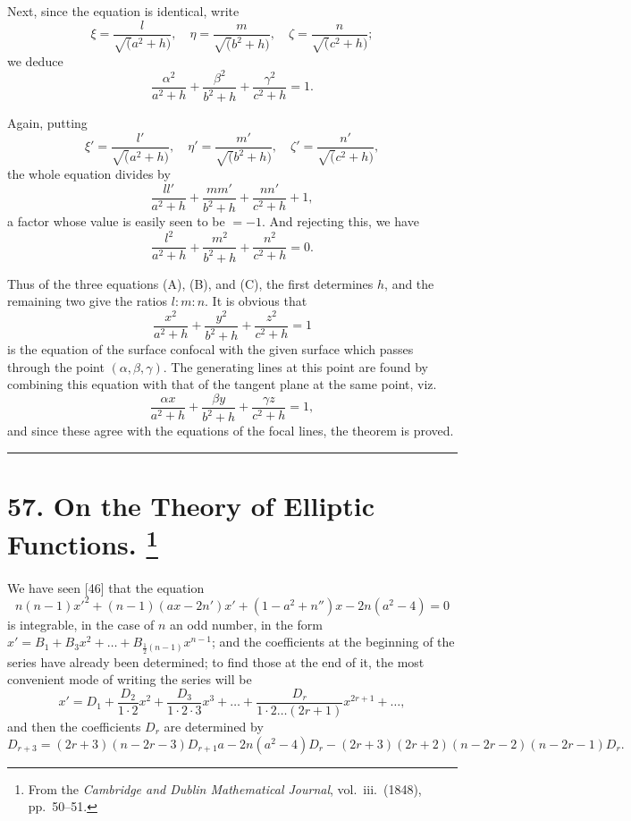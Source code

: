 \documentclass[11pt,a4paper]{article}
\theoremstyle{plain}
\theoremstyle{definition}
\begin{document}
Next, since the equation is identical, write
\[
\xi = \frac{l}{\surd(a^2 + h)}, \quad \eta = \frac{m}{\surd(b^2 + h)}, \quad \zeta = \frac{n}{\surd(c^2 + h)};
\]
we deduce
\[
\frac{\alpha^2}{a^2 + h} + \frac{\beta^2}{b^2 + h} + \frac{\gamma^2}{c^2 + h} = 1.
\]

Again, putting
\[
\xi' = \frac{l'}{\surd(a^2 + h)}, \quad \eta' = \frac{m'}{\surd(b^2 + h)}, \quad \zeta' = \frac{n'}{\surd(c^2 + h)},
\]
the whole equation divides by
\[
\frac{ll'}{a^2 + h} + \frac{mm'}{b^2 + h} + \frac{nn'}{c^2 + h} + 1,
\]
a factor whose value is easily seen to be $= -1$. And rejecting this, we have
\[
\frac{l^2}{a^2 + h} + \frac{m^2}{b^2 + h} + \frac{n^2}{c^2 + h} = 0. \tag{C}
\]

Thus of the three equations (A), (B), and (C), the first determines $h$, and the remaining
two give the ratios $l : m : n$. It is obvious that
\[
\frac{x^2}{a^2 + h} + \frac{y^2}{b^2 + h} + \frac{z^2}{c^2 + h} = 1
\]
is the equation of the surface confocal with the given surface which passes through
the point $(\alpha, \beta, \gamma)$. The generating lines at this point are found by combining this
equation with that of the tangent plane at the same point, viz.
\[
\frac{\alpha x}{a^2 + h} + \frac{\beta y}{b^2 + h} + \frac{\gamma z}{c^2 + h} = 1,
\]
and since these agree with the equations of the focal lines, the theorem is proved.

\bigskip
\hrule
\bigskip

\newpage
\section[On the Theory of Elliptic Functions]{%
57. On the Theory of Elliptic Functions.%
\footnote{From the \textit{Cambridge and Dublin Mathematical Journal}, vol.~iii.\ (1848), pp.~50--51.}}

We have seen [46] that the equation
\[
n(n-1)x'^2 + (n-1)(ax - 2n')x' + (1 - a^2 + n'')x - 2n(a^2 - 4) = 0
\]
is integrable, in the case of $n$ an odd number, in the form
$x' = B_1 + B_3 x^2 + \ldots + B_{\frac{1}{2}(n-1)} x^{n-1}$;
and the coefficients at the beginning of the series have already been determined; to
find those at the end of it, the most convenient mode of writing the series will be
\[
x' = D_1 + \frac{D_2}{1 \cdot 2}x^2 + \frac{D_3}{1 \cdot 2 \cdot 3}x^3 + \ldots
+ \frac{D_r}{1 \cdot 2 \ldots (2r+1)}x^{2r+1} + \ldots,
\]
and then the coefficients $D_r$ are determined by
\[
D_{r+3} = (2r+3)(n - 2r - 3) D_{r+1} a - 2n(a^2 - 4) D_r
- (2r+3)(2r+2)(n - 2r - 2)(n - 2r - 1) D_r.
\]
\end{document}
